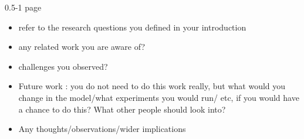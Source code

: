 0.5-1 page
\begin{itemize}
\item refer to the research questions you defined in your introduction
\item any related work you are aware of?
\item challenges you observed?
\item Future work : you do not need to do this work really, but what would you change in the model/what experiments you would run/ etc, if you would have a chance to do this? What other people should look into?
\item Any thoughts/observations/wider implications
\end{itemize}